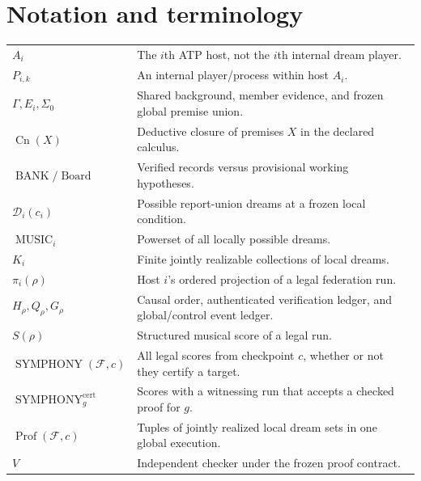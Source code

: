 \documentclass[11pt,letterpaper]{article}
\theoremstyle{definition}
\theoremstyle{remark}
\newcommand{\Cn}{\operatorname{Cn}}
\newcommand{\Dream}{\mathcal{D}}
\newcommand{\Music}{\operatorname{MUSIC}}
\newcommand{\Sym}{\operatorname{SYMPHONY}}
\newcommand{\Bank}{\operatorname{BANK}}
\newcommand{\Board}{\operatorname{Board}}
\begin{document}
\section*{Notation and terminology}
\begin{tabularx}{\textwidth}{@{}p{}X@{}}
$A_i$ & The $i$th ATP host, not the $i$th internal dream player.\\
$P_{i,k}$ & An internal player/process within host $A_i$.\\
$\Gamma, E_i,\Sigma_0$ & Shared background, member evidence, and frozen global premise union.\\
$\Cn(X)$ & Deductive closure of premises $X$ in the declared calculus.\\
$\Bank/\Board$ & Verified records versus provisional working hypotheses.\\
$\Dream_i(c_i)$ & Possible report-union dreams at a frozen local condition.\\
$\Music_i$ & Powerset of all locally possible dreams.\\
$K_i$ & Finite jointly realizable collections of local dreams.\\
$\pi_i(\rho)$ & Host $i$'s ordered projection of a legal federation run.\\
$H_\rho,Q_\rho,G_\rho$ & Causal order, authenticated verification ledger, and global/control event ledger.\\
$S(\rho)$ & Structured musical score of a legal run.\\
$\Sym(\mathcal F,c)$ & All legal scores from checkpoint $c$, whether or not they certify a target.\\
$\Sym_g^{\mathrm{cert}}$ & Scores with a witnessing run that accepts a checked proof for $g$.\\
$\operatorname{Prof}(\mathcal F,c)$ & Tuples of jointly realized local dream sets in one global execution.\\
$V$ & Independent checker under the frozen proof contract.\\
\end{tabularx}
\end{document}
